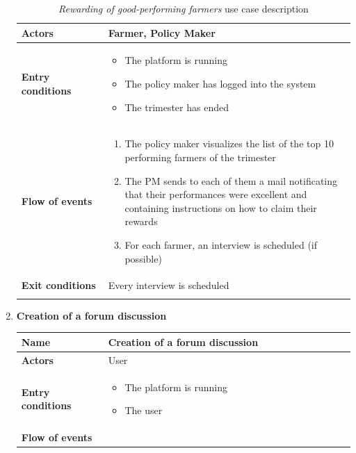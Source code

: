 \documentclass[10pt]{article}
\begin{document}
\begin{enumerate}[label=\textbf{UC\arabic*}]
\begin{longtable}{p{0.26\linewidth}p{0.75\linewidth}}
            \midrule
            \textbf{Actors} & Farmer, Policy Maker\\
            \midrule
            \textbf{Entry conditions} & 
            \begin{itemize}
                \item The platform is running
                \item The policy maker has logged into the system
                \item The trimester has ended
            \end{itemize}\\
            \midrule
            \textbf{Flow of events} & 
            \begin{enumerate}
                \item The policy maker visualizes the list of the top 10 performing farmers of the trimester
                \item The PM sends to each of them a mail notificating that their performances were excellent and containing instructions on how to claim their rewards
                \item For each farmer, an interview is scheduled (if possible)
            \end{enumerate} \\
            \midrule
            \textbf{Exit conditions} & Every interview is scheduled\\
            \midrule
            \bottomrule
            \caption{\emph{Rewarding of good-performing farmers} use case description}
        \end{longtable}
    \newpage
    \item \label{uc:uc8} \textbf{Creation of a forum discussion} 
        \begin{longtable}{p{0.26\linewidth}p{0.75\linewidth}}
            \toprule
            \textbf{Name} & \textbf{Creation of a forum discussion} \\
            \midrule
            \textbf{Actors} & User \\
            \midrule
            \textbf{Entry conditions} & 
            \begin{itemize}
                \item The platform is running
                \item The user
            \end{itemize}\\
            \midrule
            \textbf{Flow of events} & 
            \begin{enumerate}

\end{enumerate}
\end{longtable}
\end{enumerate}
\end{document}

